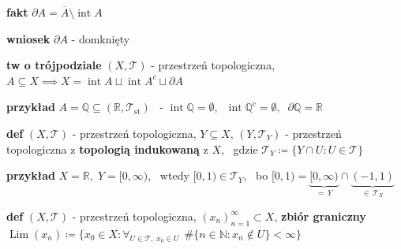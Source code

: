 \documentclass[a4paper,12pt]{article}
\begin{document}
\smallskip
\textbf{fakt} \; \(\partial A = \overline{A} \setminus \operatorname{int} A\)

\smallskip
\textbf{wniosek} \; \(\partial A\) - domknięty

\bigskip
\textbf{tw o trójpodziale} \; \((X, \mathcal{T})\) - przestrzeń topologiczna, \; \(A \subseteq X \implies X = \operatorname{int} A \sqcup \operatorname{int} A^c \sqcup \partial A\)

\bigskip
\begin{logbox}
\textbf{przykład} \; \(A = \mathbb{Q} \subseteq (\mathbb{R}, \mathcal{T}_{\text{st}})\) \, - \(\operatorname{int} \mathbb{Q} = \emptyset, \;\; \operatorname{int} \mathbb{Q}^c = \emptyset, \;\; \partial \mathbb{Q} = \mathbb{R}\)
\end{logbox}

\bigskip
\textbf{def} \; \((X, \mathcal{T})\) - przestrzeń topologiczna, \; \(Y \subseteq X\), \; \((Y, \mathcal{T}_Y)\) - przestrzeń topologiczna z \textbf{topologią indukowaną} z \(X\), \, gdzie \(\mathcal{T}_Y \coloneqq \{Y \cap U : U \in \mathcal{T}\}\)

\bigskip
\begin{logbox}
\textbf{przykład} \; \(X = \mathbb{R}, \; Y = [0, \infty)\), \, wtedy \([0, 1) \in \mathcal{T}_Y\), \, bo \([0, 1) = \underbrace{[0, \infty)}_{= \, Y} \cap \underbrace{(-1, 1)}_{\in \, \mathcal{T}_X}\)
\end{logbox}

\bigskip
\textbf{def} \; \((X, \mathcal{T})\) - przestrzeń topologiczna, \; \((x_n)_{n=1}^{\infty} \subset X\), \; \textbf{zbiór graniczny} \, \(\operatorname{Lim}(x_n) \coloneqq \{x_0 \in X : \forall_{U \in \mathcal{T}, \; x_0 \in U} \;\, \#\{n \in \mathbb{N} : x_n \notin U\} < \infty\}\)
\end{document}
